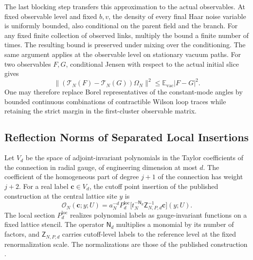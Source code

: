 \documentclass[11pt,a4paper]{article}
\numberwithin{equation}{section}
\begin{document}
The last blocking step transfers this approximation to the actual observables. At fixed observable level and fixed \(b,v\), the density of every final Haar noise variable is uniformly bounded, also conditional on the parent field and the branch. For any fixed finite collection of observed links, multiply the bound a finite number of times. The resulting bound is preserved under mixing over the conditioning. The same argument applies at the observable level on stationary vacuum paths. For two observables \(F,G\), conditional Jensen with respect to the actual initial slice gives
\[
 \|(\mathcal T_N(F)-\mathcal T_N(G))\Omega_N\|^2
     \leq \mathbb E_{\mathrm{vac}}|F-G|^2 .
\]
One may therefore replace Borel representatives of the constant-mode angles by bounded continuous combinations of contractible Wilson loop traces while retaining the strict margin in the first-cluster observable matrix.

\subsection{Reflection Norms of Separated Local Insertions}
\label{app:cam-local-mark}

Let \(V_d\) be the space of adjoint-invariant polynomials in the Taylor coefficients of the connection in radial gauge, of engineering dimension at most \(d\). The coefficient of the homogeneous part of degree \(j+1\) of the connection has weight \(j+2\). For a real label \(\mathbf c\in V_d\), the cutoff point insertion of the published construction at the central lattice site \(y\) is
\[
 \mathcal O_N(\mathbf c;y;U)
   =a_N^{-d}P_d^{\mathrm{loc}}\bigl[t_N^{-\mathsf N_d}\mathsf Z_{N,P,d}^{-1}\mathbf c\bigr](y;U).
\]
The local section \(P_d^{\mathrm{loc}}\) realizes polynomial labels as gauge-invariant functions on a fixed lattice stencil. The operator \(\mathsf N_d\) multiplies a monomial by its number of factors, and \(\mathsf Z_{N,P,d}\) carries cutoff-level labels to the reference level at the fixed renormalization scale. The normalizations are those of the published construction \cite[Definitions 2.7--2.8]{armstrong}.
\end{document}

